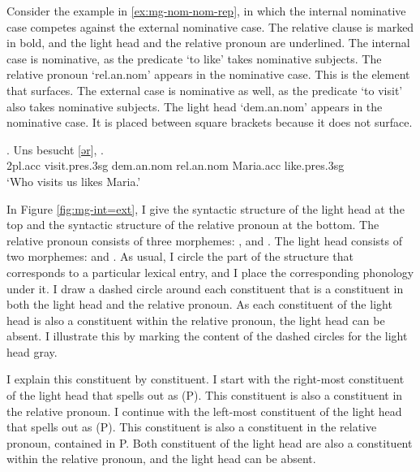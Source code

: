 Consider the example in \ref{ex:mg-nom-nom-rep}, in which the internal nominative case competes against the external nominative case. The relative clause is marked in bold, and the light head and the relative pronoun are underlined.
The internal case is nominative, as the predicate  `to like' takes nominative subjects. The relative pronoun  `\ac{rel}.\ac{an}.\ac{nom}' appears in the nominative case. This is the element that surfaces.
The external case is nominative as well, as the predicate  `to visit' also takes nominative subjects. The light head  `\ac{dem}.\ac{an}.\ac{nom}' appears in the nominative case. It is placed between square brackets because it does not surface.

\exg. Uns besucht [\underline{ər}], \underline{}  .\\
 2\ac{pl}.\ac{acc} visit.\ac{pres}.3\ac{sg}\scsub{[nom]} \ac{dem}.\ac{an}.\ac{nom} \ac{rel}.\ac{an}.\ac{nom} Maria.\ac{acc} like.\ac{pres}.3\ac{sg}\scsub{[nom]}\\
 `Who visits us likes Maria.' \label{ex:mg-nom-nom-rep}

In Figure \ref{fig:mg-int=ext}, I give the syntactic structure of the light head at the top and the syntactic structure of the relative pronoun at the bottom.
The relative pronoun consists of three morphemes: ,  and .
The light head consists of two morphemes:  and .
As usual, I circle the part of the structure that corresponds to a particular lexical entry, and I place the corresponding phonology under it.
I draw a dashed circle around each constituent that is a constituent in both the light head and the relative pronoun.
As each constituent of the light head is also a constituent within the relative pronoun, the light head can be absent. I illustrate this by marking the content of the dashed circles for the light head gray.

I explain this constituent by constituent.
I start with the right-most constituent of the light head that spells out as  (P). This constituent is also a constituent in the relative pronoun.
I continue with the left-most constituent of the light head that spells out as  (P). This constituent is also a constituent in the relative pronoun, contained in P.
Both constituent of the light head are also a constituent within the relative pronoun, and the light head can be absent.

